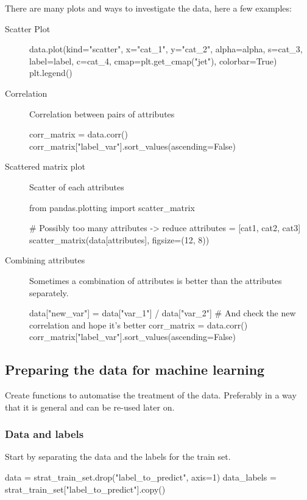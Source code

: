 There are many plots and ways to investigate the data, here a few examples:
\begin{description}
  \item [Scatter Plot] \hfill
  \begin{python}
    data.plot(kind="scatter", x="cat_1", y="cat_2", alpha=alpha,
          s=cat_3, label=label, c=cat_4, cmap=plt.get_cmap("jet"),
          colorbar=True)
          plt.legend()
        \end{python}

  \item [Correlation] Correlation between pairs of attributes \hfill
    \begin{python}
      corr_matrix = data.corr()
      corr_matrix["label_var"].sort_values(ascending=False)
    \end{python}

  \item [Scattered matrix plot] Scatter of each attributes \hfill
    \begin{python}
      from pandas.plotting import scatter_matrix

      # Possibly too many attributes -> reduce
      attributes = [cat1, cat2, cat3]
      scatter_matrix(data[attributes], figsize=(12, 8))
    \end{python}

  \item [Combining attributes] Sometimes a combination of attributes is better than the attributes separately. \hfill
    \begin{python}
      data["new_var"] = data["var_1"] / data["var_2"]
      # And check the new correlation and hope it's better
      corr_matrix = data.corr()
      corr_matrix["label_var"].sort_values(ascending=False)
    \end{python}
\end{description}

\subsection{Preparing the data for machine learning}
Create functions to automatise the treatment of the data.
Preferably in a way that it is general and can be re-used later on.

    \subsubsection*{Data and labels}
      Start by separating the data and the labels for the train set.
      \begin{python}
        data = strat_train_set.drop("label_to_predict", axis=1)
        data_labels = strat_train_set["label_to_predict"].copy()
      \end{python}

